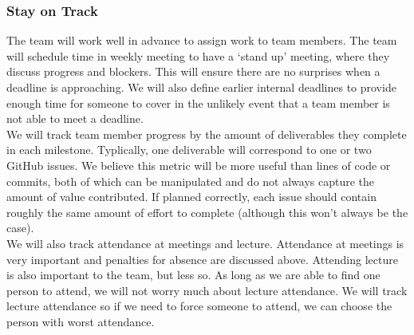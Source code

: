 \documentclass{article}
\begin{document}
\begin{itemize}
\subsubsection*{Stay on Track}

The team will work well in advance to assign work to team members. The team will schedule time in weekly meeting to have a `stand up' meeting, where they
discuss progress and blockers. This will ensure there are no surprises when a deadline is approaching. We will also define earlier internal deadlines to provide enough
time for someone to cover in the unlikely event that a team member is not able to meet a deadline.\\

We will track team member progress by the amount of deliverables they complete in each milestone. Typlically, one deliverable will correspond to one or two 
GitHub issues. We believe this metric will be more useful than lines of code or commits, both of which can be manipulated and do not always capture the 
amount of value contributed. If planned correctly, each issue should contain roughly the same amount of effort to complete (although this won't always be the case).\\

We will also track attendance at meetings and lecture. Attendance at meetings is very important and penalties for absence are discussed above. Attending lecture is
also important to the team, but less so. As long as we are able to find one person to attend, we will not worry much about lecture attendance. We will 
track lecture attendance so if we need to force someone to attend, we can choose the person with worst attendance.





\end{itemize}
\end{document}
